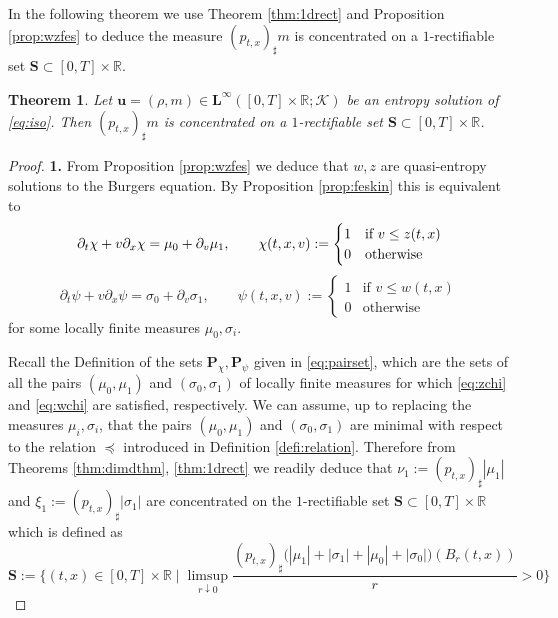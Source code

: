 \documentclass[11pt, twoside, reqno]{amsart}
\newtheorem{thm}{Theorem}[section]
\theoremstyle{definition}
\theoremstyle{remark}
\numberwithin{equation}{section}
\newcommand{\bs}[1]{\boldsymbol{#1}}
\begin{document}
In the following theorem we use Theorem \ref{thm:1drect} and Proposition \ref{prop:wzfes} to deduce the measure $(p_{t,x})_\sharp m$ is concentrated on a $1$-rectifiable set $\mathbf S \subset [0,T] \times \mathbb R$.
\begin{thm}\label{thm:isereg}
   Let $\bs u =(\rho, m) \in \mathbf L^\infty([0,T] \times \mathbb R; \mathcal K)$ be an entropy solution of \eqref{eq:iso}. Then $(p_{t,x})_\sharp m$ is concentrated on a $1$-rectifiable set $\mathbf S \subset [0,T] \times \mathbb R$.
\end{thm}
\begin{proof}
   \textbf{1.} From Proposition \ref{prop:wzfes} we deduce that $w, z$ are quasi-entropy solutions to the Burgers equation. By Proposition \ref{prop:feskin} this is equivalent to 
    \begin{equation}\label{eq:zchi}
        \partial_t \chi  + v \partial_x \chi = \mu_0 + \partial_v \mu_1, \qquad \chi(t,x,v) := \begin{cases}
            1 & \text{if $ v \leq z(t,x)$}\\
            0 & \text{otherwise}
        \end{cases}
    \end{equation}
    \begin{equation}\label{eq:wchi}
        \partial_t \psi + v \partial_x \psi = \sigma_0 + \partial_v \sigma_1, \qquad \psi(t,x,v) := \begin{cases}
            1 & \text{if $v \leq w(t,x)$}\\
            0 & \text{otherwise}
            \end{cases}
    \end{equation}
for some locally finite measures $\mu_0, \sigma_i$.

Recall the Definition of the sets $\mathbf P_\chi, \mathbf P_\psi$ given in \eqref{eq:pairset}, which are the sets of all the pairs $(\mu_0, \mu_1)$ and $(\sigma_0, \sigma_1)$ of locally finite measures for which \eqref{eq:zchi} and \eqref{eq:wchi} are satisfied, respectively. We can assume, up to replacing the measures $\mu_i, \sigma_i$, that the pairs $(\mu_0, \mu_1)$ and $(\sigma_0, \sigma_1)$ are minimal with respect to the relation  $\preceq$ introduced in Definition \ref{defi:relation}. Therefore from Theorems \ref{thm:dimdthm}, \ref{thm:1drect} we readily deduce that $\nu_1 := (p_{t,x})_\sharp |\mu_1|$ and $\xi_1 := (p_{t,x})_\sharp |\sigma_1|$ are concentrated on the $1$-rectifiable set $\mathbf S \subset [0,T] \times \mathbb R$ which is defined as 
\begin{equation}
    \mathbf S := \Bigg\{(t,x) \in [0,T] \times \mathbb R \; \Big| \; \limsup_{r \downarrow 0} \frac{(p_{t,x})_\sharp\big(|\mu_1| +|\sigma_1| + |\mu_0| + |\sigma_0|\big)(B_r(t,x))}{r} > 0  \Bigg\}
\end{equation}



\end{proof}
\end{document}
